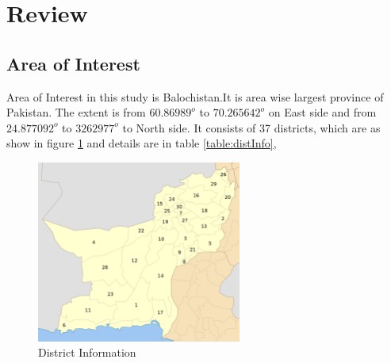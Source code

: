\section{Review}

\subsection{Area of Interest}
Area of Interest in this study is Balochistan.It is area wise largest province of Pakistan.
The extent is from $60.86989^o$ to $70.265642^o$ on East side and from $24.877092^o$ to $3262977^o$ to North side.
It consists of 37 districts, which are as show in figure \ref{fig:distInfo} and details are in table \ref{table:distInfo},
\begin{figure}[H]
    \centering
    \includegraphics[width=0.6\textwidth]{images/Balochistan_Districts}
    \caption{District Information}\label{fig:distInfo}
\end{figure}
